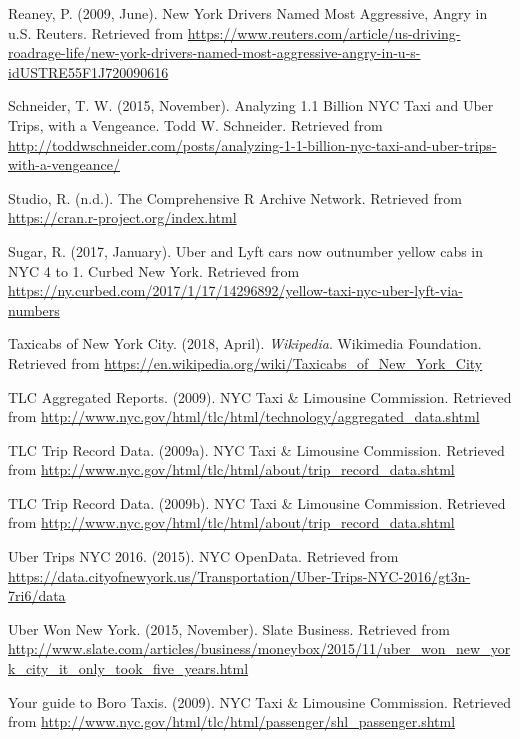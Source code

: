 \documentclass[12pt,twoside]{reedthesis}
\theoremstyle{definition}
\theoremstyle{definition}
\theoremstyle{definition}
\theoremstyle{remark}
\begin{document}
\hypertarget{ref-reaney2009}{}
Reaney, P. (2009, June). New York Drivers Named Most Aggressive, Angry
in u.S. Reuters. Retrieved from
\url{https://www.reuters.com/article/us-driving-roadrage-life/new-york-drivers-named-most-aggressive-angry-in-u-s-idUSTRE55F1J720090616}

\hypertarget{ref-schneider2015}{}
Schneider, T. W. (2015, November). Analyzing 1.1 Billion NYC Taxi and
Uber Trips, with a Vengeance. Todd W. Schneider. Retrieved from
\url{http://toddwschneider.com/posts/analyzing-1-1-billion-nyc-taxi-and-uber-trips-with-a-vengeance/}

\hypertarget{ref-cran}{}
Studio, R. (n.d.). The Comprehensive R Archive Network. Retrieved from
\url{https://cran.r-project.org/index.html}

\hypertarget{ref-sugar2017}{}
Sugar, R. (2017, January). Uber and Lyft cars now outnumber yellow cabs
in NYC 4 to 1. Curbed New York. Retrieved from
\url{https://ny.curbed.com/2017/1/17/14296892/yellow-taxi-nyc-uber-lyft-via-numbers}

\hypertarget{ref-wikipediataxi}{}
Taxicabs of New York City. (2018, April). \emph{Wikipedia}. Wikimedia
Foundation. Retrieved from
\url{https://en.wikipedia.org/wiki/Taxicabs_of_New_York_City}

\hypertarget{ref-datayellowmonth}{}
TLC Aggregated Reports. (2009). NYC Taxi \& Limousine Commission.
Retrieved from
\url{http://www.nyc.gov/html/tlc/html/technology/aggregated_data.shtml}

\hypertarget{ref-datayellow}{}
TLC Trip Record Data. (2009a). NYC Taxi \& Limousine Commission.
Retrieved from
\url{http://www.nyc.gov/html/tlc/html/about/trip_record_data.shtml}

\hypertarget{ref-datauber}{}
TLC Trip Record Data. (2009b). NYC Taxi \& Limousine Commission.
Retrieved from
\url{http://www.nyc.gov/html/tlc/html/about/trip_record_data.shtml}

\hypertarget{ref-datauberweek}{}
Uber Trips NYC 2016. (2015). NYC OpenData. Retrieved from
\url{https://data.cityofnewyork.us/Transportation/Uber-Trips-NYC-2016/gt3n-7ri6/data}

\hypertarget{ref-ubernyc}{}
Uber Won New York. (2015, November). Slate Business. Retrieved from
\url{http://www.slate.com/articles/business/moneybox/2015/11/uber_won_new_york_city_it_only_took_five_years.html}

\hypertarget{ref-greentaxi}{}
Your guide to Boro Taxis. (2009). NYC Taxi \& Limousine Commission.
Retrieved from
\url{http://www.nyc.gov/html/tlc/html/passenger/shl_passenger.shtml}


\end{document}
